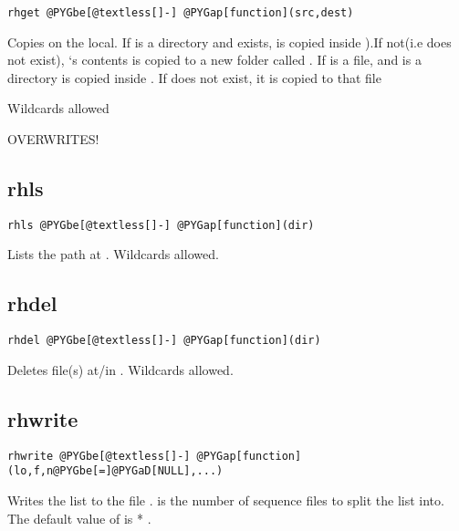 \documentclass[letterpaper,10pt,english]{manual}
\begin{document}
\begin{Verbatim}[commandchars=@\[\]]
rhget @PYGbe[@textless[]-] @PYGap[function](src,dest)
\end{Verbatim}

Copies  on the local. If  is a directory and  exists,
 is copied inside ).If not(i.e
 does not exist), `s contents is copied to a new folder called
.  If  is a file, and  is a directory  is copied
inside  . If  does not exist, it is copied to that file

Wildcards allowed

OVERWRITES!


\subsection{rhls}

\begin{Verbatim}[commandchars=@\[\]]
rhls @PYGbe[@textless[]-] @PYGap[function](dir)
\end{Verbatim}

Lists the path at . Wildcards allowed.


\subsection{rhdel}

\begin{Verbatim}[commandchars=@\[\]]
rhdel @PYGbe[@textless[]-] @PYGap[function](dir)
\end{Verbatim}

Deletes file(s) at/in . Wildcards allowed.


\subsection{rhwrite}

\begin{Verbatim}[commandchars=@\[\]]
rhwrite @PYGbe[@textless[]-] @PYGap[function](lo,f,n@PYGbe[=]@PYGaD[NULL],...)
\end{Verbatim}

Writes the list   to the file .  is the number of sequence files
to split the list into.  The default value of  is
 *  .
\end{document}
